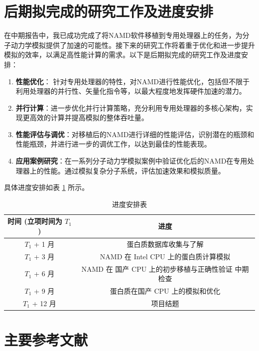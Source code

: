 \section{后期拟完成的研究工作及进度安排}

在中期报告中，我已成功完成了将NAMD软件移植到专用处理器上的任务，为分子动力学模拟提供了加速的可能性。接下来的研究工作将着重于优化和进一步提升模拟的效率，以满足高性能计算的需求。以下是后期拟完成的研究工作及进度安排：

\begin{enumerate}
    \item \textbf{性能优化}： 针对专用处理器的特性，对NAMD进行性能优化，包括但不限于利用处理器的并行性、矢量化指令等，以最大程度地发挥硬件加速的潜力。
    \item \textbf{并行计算}：进一步优化并行计算策略，充分利用专用处理器的多核心架构，实现更高效的计算并提高模拟的整体吞吐量。
    \item \textbf{性能评估与调优}：对移植后的NAMD进行详细的性能评估，识别潜在的瓶颈和性能瓶颈，并进行进一步的调优工作，以达到最佳的性能表现。
    \item \textbf{应用案例研究}：在一系列分子动力学模拟案例中验证优化后的NAMD在专用处理器上的性能。通过模拟复杂分子系统，评估加速效果和模拟质量。
\end{enumerate}

具体进度安排如表 \ref{tab:progress} 所示。

\begin{table}[H]
    \centering
    \caption{进度安排表}
    \label{tab:progress}
    \begin{tabular}{cc}
        \toprule
        时间 (立项时间为 $T_1$) & 进度                              \\
        \midrule
        $T_1$ + 1 月      & 蛋白质数据库收集与了解                     \\
        $T_1$ + 3 月      & NAMD 在 Intel CPU 上的蛋白质计算模拟      \\
        $T_1$ + 6 月      & NAMD 在 国产 CPU 上的初步移植与正确性验证 中期检查 \\
        $T_1$ + 9 月      & 蛋白质在国产 CPU 上的模拟和优化              \\
        $T_1$ + 12 月     & 项目结题                            \\
        \bottomrule
    \end{tabular}
\end{table}



\section{主要参考文献}



